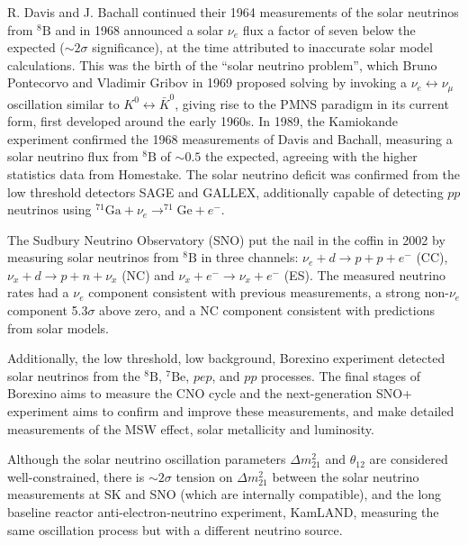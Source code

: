 R. Davis and J. Bachall continued their 1964 measurements\cite{davis} of the solar neutrinos from $^{8}\text{B}$ and in 1968\cite{davis_sun} announced a solar $\nu_e$ flux a factor of seven below the expected ($\sim2\sigma$ significance), at the time attributed to inaccurate solar model calculations. This was the birth of the ``solar neutrino problem'', which Bruno Pontecorvo and Vladimir Gribov in 1969\cite{pontecorvo_gribov} proposed solving by invoking a $\nu_e\leftrightarrow\nu_\mu$ oscillation similar to $K^0 \leftrightarrow\bar{K}^0$, giving rise to the PMNS paradigm in its current form, first developed around the early 1960s. In 1989, the Kamiokande experiment\cite{kamiokande_solar} confirmed the 1968 measurements of Davis and Bachall, measuring a solar neutrino flux from $^{8}\text{B}$  of $\sim0.5$ the expected, agreeing with the higher statistics data from Homestake\cite{davis_sun2}. The solar neutrino deficit was confirmed from the low threshold detectors SAGE\cite{sage_solar} and GALLEX\cite{gallex_solar}, additionally capable of detecting $p p$ neutrinos using $^{71}\text{Ga}+\nu_e \rightarrow ^{71}\text{Ge}+e^-$.

The Sudbury Neutrino Observatory (SNO) put the nail in the coffin in 2002\cite{sno_solar} by measuring solar neutrinos from $^{8}\text{B}$ in three channels: $\nu_e + d \rightarrow p+p+e^-$ (CC), $\nu_x + d\rightarrow p+ n + \nu_x$ (NC) and $\nu_x + e^- \rightarrow \nu_x+e^-$ (ES). The measured neutrino rates had a $\nu_e$ component consistent with previous measurements, a strong non-$\nu_e$ component 5.3$\sigma$ above zero, and a NC component consistent with predictions from solar models.

Additionally, the low threshold, low background, Borexino experiment detected solar neutrinos from the $^{8}\text{B}$, $^{7}\text{Be}$, $pep$, and $pp$ processes\cite{borexino_summary}. The final stages of Borexino aims to measure the CNO cycle and the next-generation SNO+ experiment aims to confirm and improve these measurements, and make detailed measurements of the MSW effect, solar metallicity and luminosity\cite{sno_plus}.

Although the solar neutrino oscillation parameters $\Delta m^2_{21}$ and $\theta_{12}$ are considered well-constrained, there is $\sim 2\sigma$ tension on $\Delta m^2_{21}$ between the solar neutrino measurements at SK and SNO (which are internally compatible), and the long baseline reactor anti-electron-neutrino experiment, KamLAND\cite{m2_tension}, measuring the same oscillation process but with a different neutrino source.

